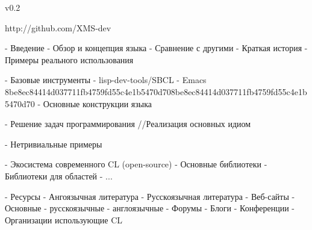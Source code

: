 v0.2

http://github.com/XMS-dev

- Введение
  - Обзор и концепция языка
  - Сравнение с другими
  - Краткая история
  - Примеры реального использования

- Базовые инструменты 
  - lisp-dev-tools/SBCL
  - Emacs\Slime
8be8ec84414d037711fb4759fd55c4e1b5470d708be8ec84414d037711fb4759fd55c4e1b5470d70
- Основные конструкции языка 

- Решение задач программирования //Реализация основных идиом

- Нетривиальные примеры

- Экосистема современного CL (open-source)
  - Основные библиотеки
  - Библиотеки для областей
    - ...

- Ресурсы 
  - Ангоязычная литература
  - Русскоязычная литература
  - Веб-сайты
    - Основные
      - русскоязычные
      - англоязычные
    - Форумы 
    - Блоги
    - Конференции
  - Организации использующие CL
  
